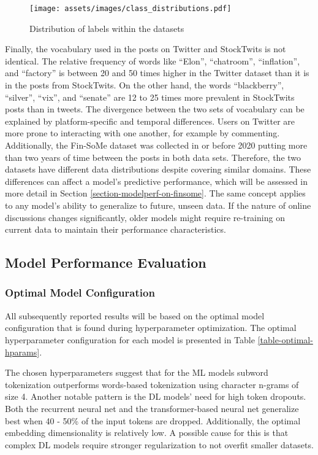 \begin{figure}[!ht]
	\texttt{[image: assets/images/class\_distributions.pdf]}
	\caption{Distribution of labels within the datasets}
	\label{figure-class-distribution}
\end{figure}

Finally, the vocabulary used in the posts on Twitter and StockTwits is not identical. The relative frequency of words like ``Elon'', ``chatroom'', ``inflation'', and ``factory'' is between 20 and 50 times higher in the Twitter dataset than it is in the posts from StockTwits. On the other hand, the words ``blackberry'', ``silver'', ``vix'', and ``senate'' are 12 to 25 times more prevalent in StockTwits posts than in tweets. The divergence between the two sets of vocabulary can be explained by platform-specific and temporal differences. Users on Twitter are more prone to interacting with one another, for example by commenting. Additionally, the Fin-SoMe dataset was collected in or before 2020 putting more than two years of time between the posts in both data sets. Therefore, the two datasets have different data distributions despite covering similar domains. These differences can affect a model's predictive performance, which will be assessed in more detail in Section \ref{section-modelperf-on-finsome}. The same concept applies to any model's ability to generalize to future, unseen data. If the nature of online discussions changes significantly, older models might require re-training on current data to maintain their performance characteristics.

\subsection{Model Performance Evaluation}

\subsubsection{Optimal Model Configuration}
All subsequently reported results will be based on the optimal model configuration that is found during hyperparameter optimization.
The optimal hyperparameter configuration for each model is presented in Table \ref{table-optimal-hparams}. 



The chosen hyperparameters suggest that for the ML models subword tokenization outperforms words-based tokenization using character n-grams of size 4. Another notable pattern is the DL models' need for high token dropouts. Both the recurrent neural net and the transformer-based neural net generalize best when 40 - 50\% of the input tokens are dropped. Additionally, the optimal embedding dimensionality is relatively low. A possible cause for this is that complex DL models require stronger regularization to not overfit smaller datasets.




